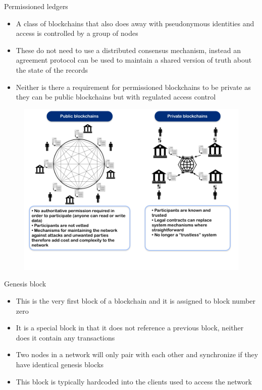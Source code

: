 \documentclass[9pt]{beamer}
\begin{document}

\begin{frame}{Permissioned ledgers}
	\begin{itemize}
		\item A class of blockchains that also does away with pseudonymous identities and access is controlled by a group of nodes
		\item These do not need to use a distributed consensus mechanism, instead an agreement protocol can be used to maintain a shared version of truth about the state of the records
		\item Neither is there a requirement for permissioned blockchains to be private as they can be public blockchains but with regulated access control
	\end{itemize}
\end{frame}


\begin{frame}
	\begin{figure}[]
		\centering
		\includegraphics  [scale=0.3]{Images/pvt}
	\end{figure}
\end{frame}


\begin{frame}{Genesis block}
	\begin{itemize}
		\item This is the very first block of a blockchain and it is assigned to block number zero
		\item It is a special block in that it does not reference a previous block, neither does it contain any transactions
		\item Two nodes in a network will only pair with each other and synchronize if they have identical genesis blocks
		\item This block is typically hardcoded into the clients used to access the network
	\end{itemize}
\end{frame}
\end{document}
